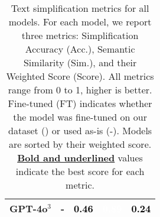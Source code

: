 \begin{table}[!h]
\begin{tabular}{lcrrr}
        \\[2pt]
        \textbf{GPT-4o}$^3$ & - & \cellcolor[HTML]{dce3f1}\textcolor{black}{0.46} & \cellcolor[HTML]{1846a2}\textcolor{white}{0.89} & \cellcolor[HTML]{c1cee6}\textcolor{black}{0.24} \\
        \bottomrule
    \end{tabular}
    \caption{Text simplification metrics for all models. For each model, we report three metrics: Simplification Accuracy (Acc.), Semantic Similarity (Sim.), and their Weighted Score (Score). All metrics range from 0 to 1, higher is better. Fine-tuned (FT) indicates whether the model was fine-tuned on our dataset (\checkmark) or used as-is (-). Models are sorted by their weighted score. \textbf{\underline{Bold and underlined}} values indicate the best score for each metric.}
    \label{tab:text_simplification_metrics}
\end{table}

